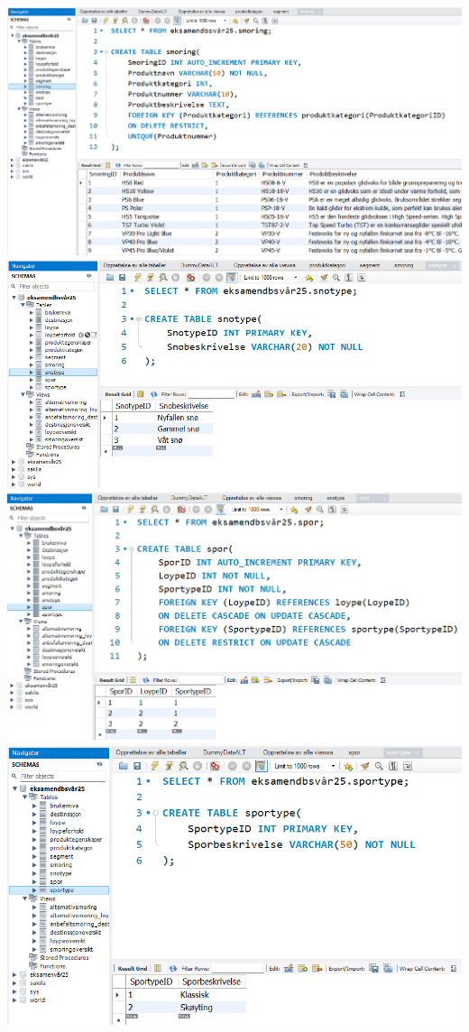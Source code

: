 \documentclass[10pt, a4paper]{article}
\begin{document}
\includegraphics[width=\textwidth]{smoring.png}
\includegraphics[width=\textwidth]{snotype.png}
\includegraphics[width=\textwidth]{spor.png}
\includegraphics[width=\textwidth]{sportype.png}
\end{document}
